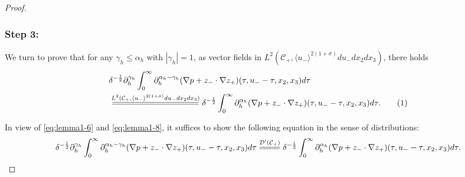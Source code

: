 \documentclass[10pt,reqno]{amsart}
\numberwithin{equation}{section}
\begin{document}
\begin{proof}
\subsubsection*{\bf Step 3:} We turn to prove that for any $\gamma_h\leqslant\alpha_h$ with $|\gamma_h|=1$, as vector fields in $L^2(\mathcal{C}_+,\langle u_{-}\rangle^{2(1+\sigma)} du_-dx_2dx_3)$, 
there holds 
	\begin{align*}
	& 
	\delta^{-\frac{1}{2}}\partial_h^{\gamma_h}\int_0^{\infty} \partial_h^{\alpha_h-\gamma_h}(\nabla p+z_{-}\cdot\nabla z_{+}) 
	(\tau,u_--\tau,x_2,x_3)d\tau\\
	&\stackrel{ L^2(\mathcal{C}_+,\langle u_-\rangle^{2(1+\sigma)}du_-dx_2dx_3)}{=\joinrel=\joinrel=\joinrel=\joinrel=\joinrel=\joinrel=\joinrel=\joinrel=\joinrel=\joinrel=\joinrel=\joinrel=\joinrel=\joinrel=\joinrel=\joinrel=}\delta^{-\frac{1}{2}}\int_0^{\infty} \partial_h^{\alpha_h}(\nabla p+z_{-}\cdot\nabla z_{+}) 
	(\tau,u_--\tau,x_2,x_3)d\tau.\stepcounter{equation}\tag{\theequation}\label{eq:lemma1-9}
\end{align*}
 
 
In view of \eqref{eq:lemma1-6} and \eqref{eq:lemma1-8}, it suffices to show the following equation in the sense of distributions:
\begin{equation}\label{eq:lemma1-2}
	\delta^{-\frac{1}{2}}\partial_h^{\gamma_h}\int_0^{\infty} \partial_h^{\alpha_h-\gamma_h}(\nabla p+z_{-}\cdot\nabla z_{+}) 
	(\tau,u_--\tau,x_2,x_3)d\tau
	\stackrel{ \mathcal{D}'(\mathcal{C}_+)}{=\joinrel=\joinrel=\joinrel=}\delta^{-\frac{1}{2}}\int_0^{\infty}  \partial_h^{\alpha_h}(\nabla p+z_{-}\cdot\nabla z_{+}) 
	(\tau,u_--\tau,x_2,x_3)d\tau. 
\end{equation}



\end{proof}
\end{document}
